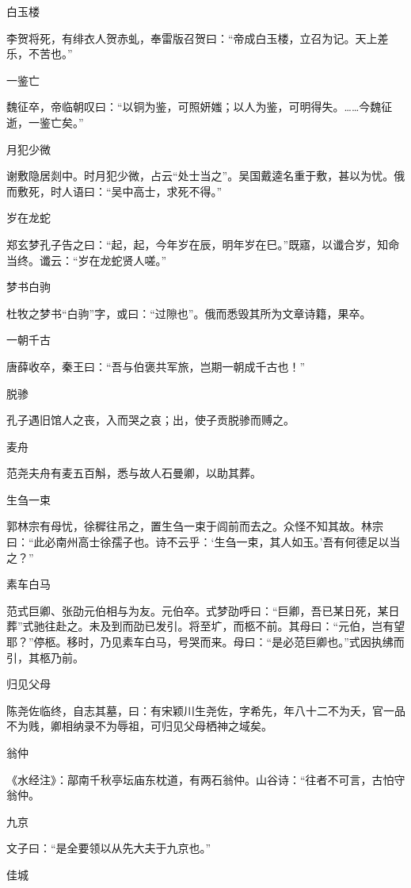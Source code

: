 \documentclass[a4paper,12pt,UTF8,twoside]{ctexbook}
\begin{document}
    白玉楼
    
    李贺将死，有绯衣人贺赤虬，奉雷版召贺曰：“帝成白玉楼，立召为记。天上差乐，不苦也。”
    
    一鉴亡
    
    魏征卒，帝临朝叹曰：“以铜为鉴，可照妍媸；以人为鉴，可明得失。……今魏征逝，一鉴亡矣。”
    
    月犯少微
    
    谢敷隐居剡中。时月犯少微，占云“处士当之”。吴国戴逵名重于敷，甚以为忧。俄而敷死，时人语曰：“吴中高士，求死不得。”
    
    岁在龙蛇
    
    郑玄梦孔子告之曰：“起，起，今年岁在辰，明年岁在巳。”既寤，以谶合岁，知命当终。谶云：“岁在龙蛇贤人嗟。”
    
    梦书白驹
    
    杜牧之梦书“白驹”字，或曰：“过隙也”。俄而悉毁其所为文章诗籍，果卒。
    
    一朝千古
    
    唐薛收卒，秦王曰：“吾与伯褒共军旅，岂期一朝成千古也！”
    
    脱骖
    
    孔子遇旧馆人之丧，入而哭之哀；出，使子贡脱骖而赙之。
    
    麦舟
    
    范尧夫舟有麦五百斛，悉与故人石曼卿，以助其葬。
    
    生刍一束
    
    郭林宗有母忧，徐穉往吊之，置生刍一束于闾前而去之。众怪不知其故。林宗曰：“此必南州高士徐孺子也。诗不云乎：‘生刍一束，其人如玉。’吾有何德足以当之？”
    
    素车白马
    
    范式巨卿、张劭元伯相与为友。元伯卒。式梦劭呼曰：“巨卿，吾已某日死，某日葬”式驰往赴之。未及到而劭已发引。将至圹，而柩不前。其母曰：“元伯，岂有望耶？”停柩。移时，乃见素车白马，号哭而来。母曰：“是必范巨卿也。”式因执绋而引，其柩乃前。
    
    归见父母
    
    陈尧佐临终，自志其墓，曰：有宋颖川生尧佐，字希先，年八十二不为夭，官一品不为贱，卿相纳录不为辱祖，可归见父母栖神之域矣。
    
    翁仲
    
    《水经注》：鄗南千秋亭坛庙东枕道，有两石翁仲。山谷诗：“往者不可言，古怕守翁仲。
    
    九京
    
    文子曰：“是全要领以从先大夫于九京也。”
    
    佳城
    
\end{document}
